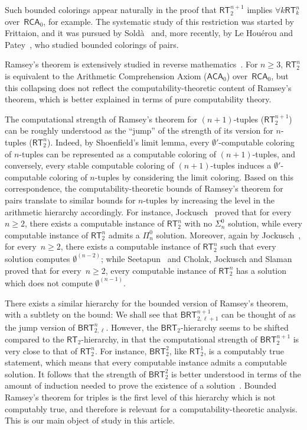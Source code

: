 \documentclass{article}
\newcommand{\RCA}[0]{\mathsf{RCA}}
\newcommand{\ACA}[0]{\mathsf{ACA}}
\newcommand{\RT}[0]{\mathsf{RT}}
\newcommand{\BRT}[0]{\mathsf{BRT}}
\def\qt#1{``#1''}%
\numberwithin{theorem}{section}
\begin{document}
Such bounded colorings appear naturally in the proof that $\RT^{n+1}_2$ implies $\forall k\RT^n_k$ over~$\RCA_0$, for example. The systematic study of this restriction was started by Frittaion, and it was pursued by Sold\`a~\cite[Section 4.1]{solda2021calibrating} and, more recently, by Le Houérou and Patey~\cite{houerou2025reverse}, who studied bounded colorings of pairs.

Ramsey's theorem is extensively studied in reverse mathematics~\cites{jockusch_ramseys_1972,simpson_subsystems_2009,seetapun1995strength}. For $n \geq 3$, $\RT^n_2$ is equivalent to the Arithmetic Comprehension Axiom ($\ACA_0$) over~$\RCA_0$, but this collapsing does not reflect the  computability-theoretic content of Ramsey's theorem, which is better explained in terms of pure computability theory.

The computational strength of Ramsey's theorem for $(n+1)$-tuples ($\RT^{n+1}_2$) can be roughly understood as the \qt{jump} of the strength of its version for $n$-tuples ($\RT^n_2$). Indeed, by Shoenfield's limit lemma, every $\emptyset'$-computable coloring of $n$-tuples can be represented as a computable coloring of $(n+1)$-tuples, and conversely, every stable computable coloring of $(n+1)$-tuples induces a $\emptyset'$-computable coloring of $n$-tuples by considering the limit coloring. Based on this correspondence, the computability-theoretic bounds of Ramsey's theorem for pairs translate to similar bounds for $n$-tuples by increasing the level in the arithmetic hierarchy accordingly. For instance, Jockusch~\cite{jockusch_ramseys_1972} proved that for every~$n \geq 2$, there exists a computable instance of $\RT^n_2$ with no $\Sigma^0_n$ solution, while every computable instance of $\RT^n_2$ admits a $\Pi^0_n$ solution. Moreover, again by Jockusch~\cite{jockusch_ramseys_1972}, for every~$n \geq 2$, there exists a computable instance of $\RT^n_2$ such that every solution computes $\emptyset^{(n-2)}$; while Seetapun~\cite{seetapun1995strength} and Cholak, Jockusch and Slaman~\cite{cholak2001strength} proved that for every~$n \geq 2$, every computable instance of $\RT^n_2$ has a solution which does not compute $\emptyset^{(n-1)}$.

There exists a similar hierarchy for the bounded version of Ramsey's theorem, with a subtlety on the bound: We shall see that $\BRT^{n+1}_{2,\ell+1}$ can be thought of as the jump version of $\BRT^n_{2,\ell}$. However, the $\BRT_2$-hierarchy seems to be shifted compared to the $\RT_2$-hierarchy, in that the computational strength of $\BRT^{n+1}_2$ is very close to that of $\RT^n_2$. For instance, $\BRT^2_2$, like $\RT^1_2$, is a computably true statement, which means that every computable instance admits a computable solution. It follows that the strength of $\BRT^2_2$ is better understood in terms of the amount of induction needed to prove the existence of a solution~\cite{houerou2025reverse}. Bounded Ramsey's theorem for triples is the first level of this hierarchy which is not computably true, and therefore is relevant for a computability-theoretic analysis. This is our main object of study in this article.
\end{document}
